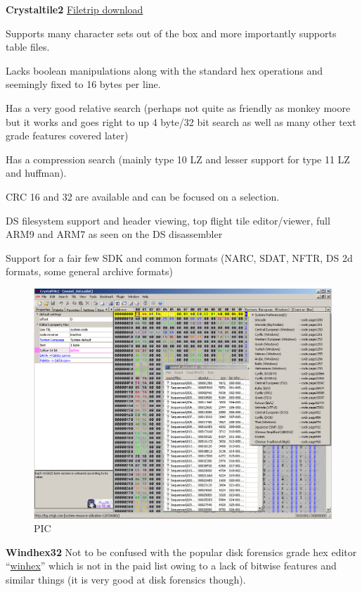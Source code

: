 \documentclass[
]{book}
\begin{document}
\textbf{Crystaltile2} \href{http://filetrip.net/f23649-CrystalTile2-2010-09-06.html}{Filetrip download}

Supports many character sets out of the box and more importantly supports table files.

Lacks boolean manipulations along with the standard hex operations and seemingly fixed to 16 bytes per line.

Has a very good relative search (perhaps not quite as friendly as monkey moore but it works and goes right to up 4 byte/32 bit search as well as many other text grade features covered later)

Has a compression search (mainly type 10 LZ and lesser support for type 11 LZ and huffman).

CRC 16 and 32 are available and can be focused on a selection.

DS filesystem support and header viewing, top flight tile editor/viewer, full ARM9 and ARM7 as seen on the DS disassembler

Support for a fair few SDK and common formats (NARC, SDAT, NFTR, DS 2d formats, some general archive formats)

\begin{figure}
\centering
\includegraphics{images/7_home_fast6191_romhackingguide_unrenamed_files___ackingguidehexeditorsshowcasecrystaltile2_1.png}
\caption{PIC}
\end{figure}

\textbf{Windhex32} Not to be confused with the popular disk forensics grade hex editor ``\href{https://www.x-ways.net/winhex/}{winhex}'' which is not in the paid list owing to a lack of bitwise features and similar things (it is very good at disk forensics though).
\end{document}
